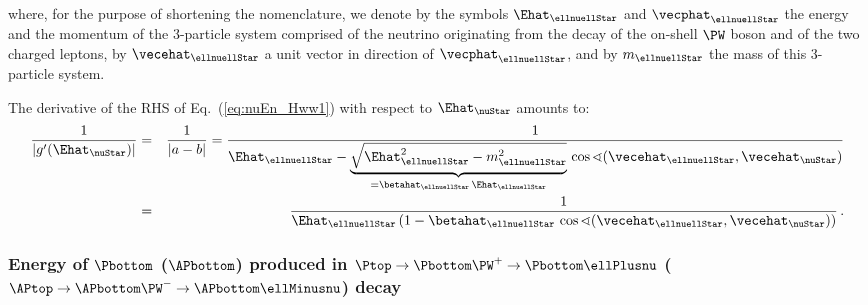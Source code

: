where, for the purpose of shortening the nomenclature, we denote by the symbols $\Ehat_{\ellnuellStar}$ and $\vecphat_{\ellnuellStar}$ the energy and the momentum
of the $3$-particle system comprised of the neutrino originating from the decay of the on-shell $\PW$ boson and of the two charged leptons,
by $\vecehat_{\ellnuellStar}$ a unit vector in direction of $\vecphat_{\ellnuellStar}$,
and by $m_{\ellnuellStar}$ the mass of this $3$-particle system.

The derivative of the RHS of Eq.~(\ref{eq:nuEn_Hww1}) with respect to $\Ehat_{\nuStar}$ amounts to:
\begin{eqnarray}
\frac{1}{|g^{\prime}(\Ehat_{\nuStar})|} 
 & = &\frac{1}{|a - b|} 
  = \frac{1}{\Ehat_{\ellnuellStar} - \underbrace{\sqrt{\Ehat_{\ellnuellStar}^{2} - m_{\ellnuellStar}^{2}}}_{= \betahat_{\ellnuellStar} \, \Ehat_{\ellnuellStar}} \, 
\cos\sphericalangle(\vecehat_{\ellnuellStar},\vecehat_{\nuStar})} \nonumber \\
 & = & \frac{1}{\Ehat_{\ellnuellStar} \left( 1 - \betahat_{\ellnuellStar} \, \cos\sphericalangle(\vecehat_{\ellnuellStar},\vecehat_{\nuStar}) \right)} \, . 
\label{eq:nuEn_Hww3}
\end{eqnarray}


\subsubsection{Energy of $\Pbottom$  ($\APbottom$) produced in $\Ptop \to \Pbottom\PW^{+} \to \Pbottom\ellPlusnu$ ($\APtop \to \APbottom\PW^{-} \to \APbottom\ellMinusnu$) decay}
\label{sec:appendix_bEn_top}

